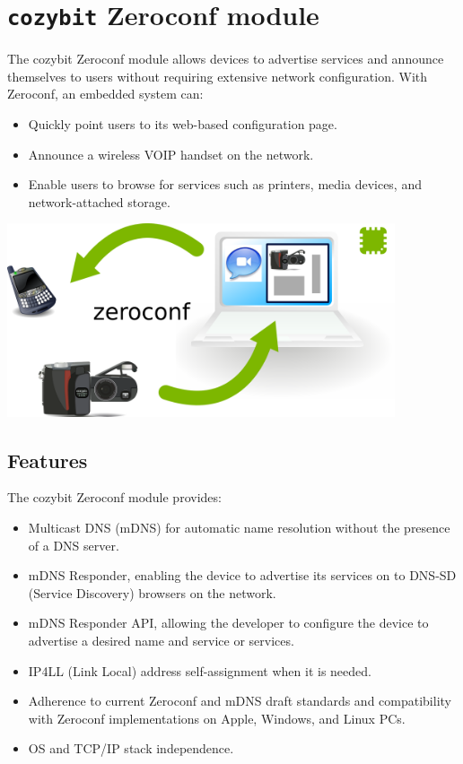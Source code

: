 \documentclass[12pt,landscape,twocolumn]{article}
\begin{document}
\section*{{\tt cozybit} Zeroconf module}
The cozybit Zeroconf module allows devices to advertise services and announce 
themselves to users without requiring extensive network configuration.  With 
Zeroconf, an embedded system can:

\begin{itemize}
	\item Quickly point users to its web-based configuration page.
	\item Announce a wireless VOIP handset on the network.
	\item Enable users to browse for services such as printers, media
		  devices, and network-attached storage.
\end{itemize}

\vspace{0.5in}
\includegraphics[width=4.5in]{zeroconf.png}
\vspace{0.5in}

\subsection*{Features}

The cozybit Zeroconf module provides:

\begin{itemize}
	\item Multicast DNS (mDNS) for automatic name resolution without the
		  presence of a DNS server.
	\item mDNS Responder, enabling the device to advertise its services on
		  to DNS-SD (Service Discovery) browsers on the network.
	\item mDNS Responder API, allowing the developer to configure the device
		  to advertise a desired name and service or services.
	\item IP4LL (Link Local) address self-assignment when it is needed.
	\item Adherence to current Zeroconf and mDNS draft standards and 
		  compatibility with Zeroconf implementations on Apple, Windows, and
		  Linux PCs.
	\item OS and TCP/IP stack independence.
\end{itemize}
\end{document}
